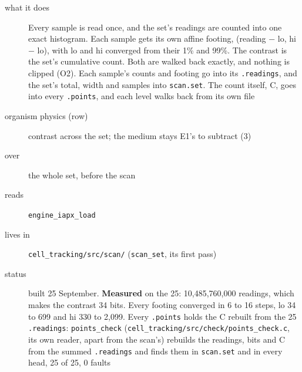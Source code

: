 \begin{description}
\item[{what it does}] Every sample is read once, and the set's readings are counted into one exact histogram. Each sample gets its own affine footing, (reading − lo, hi − lo), with lo and hi converged from their 1\% and 99\%. The contrast is the set's cumulative count. Both are walked back exactly, and nothing is clipped (O2). Each sample's counts and footing go into its \texttt{.\allowbreak{}readings}, and the set's total, width and samples into \texttt{scan.\allowbreak{}set}. The count itself, C, goes into every \texttt{.\allowbreak{}points}, and each level walks back from its own file
\item[{organism physics (row)}] contrast across the set; the medium stays E1's to subtract (3)
\item[{over}] the whole set, before the scan
\item[{reads}] \texttt{engine\_\allowbreak{}iapx\_\allowbreak{}load}
\item[{lives in}] \texttt{cell\_\allowbreak{}tracking/\allowbreak{}src/\allowbreak{}scan/\allowbreak{}} (\texttt{scan\_\allowbreak{}set}, its first pass)
\item[{status}] built 25 September. \textbf{Measured} on the 25: 10,485,760,000 readings, which makes the contrast 34 bits. Every footing converged in 6 to 16 steps, lo 34 to 699 and hi 330 to 2,099. Every \texttt{.\allowbreak{}points} holds the C rebuilt from the 25 \texttt{.\allowbreak{}readings}: \texttt{points\_\allowbreak{}check} (\texttt{cell\_\allowbreak{}tracking/\allowbreak{}src/\allowbreak{}check/\allowbreak{}points\_\allowbreak{}check.\allowbreak{}c}, its own reader, apart from the scan's) rebuilds the readings, bits and C from the summed \texttt{.\allowbreak{}readings} and finds them in \texttt{scan.\allowbreak{}set} and in every head, 25 of 25, 0 faults
\end{description}

